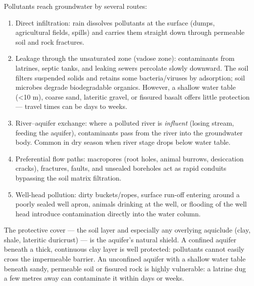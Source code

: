 \documentclass[11pt]{article}
\newcommand{\cle}[1]{{\popxbold\color{popdark}#1}}
\begin{document}
Pollutants reach groundwater by several routes:
\begin{enumerate}
\item \cle{Direct infiltration}: rain dissolves pollutants at the surface (dumps, agricultural fields, spills) and carries them straight down through permeable soil and rock fractures.
\item \cle{Leakage through the unsaturated zone (vadose zone)}: contaminants from latrines, septic tanks, and leaking sewers percolate slowly downward. The soil filters suspended solids and retains some bacteria/viruses by adsorption; soil microbes degrade biodegradable organics. However, a shallow water table (\textless 10 m), coarse sand, lateritic gravel, or fissured basalt offers little protection — travel times can be days to weeks.
\item \cle{River--aquifer exchange}: where a polluted river is \emph{influent} (losing stream, feeding the aquifer), contaminants pass from the river into the groundwater body. Common in dry season when river stage drops below water table.
\item \cle{Preferential flow paths}: macropores (root holes, animal burrows, desiccation cracks), fractures, faults, and unsealed boreholes act as rapid conduits bypassing the soil matrix filtration.
\item \cle{Well-head pollution}: dirty buckets/ropes, surface run-off entering around a poorly sealed well apron, animals drinking at the well, or flooding of the well head introduce contamination directly into the water column.
\end{enumerate}

The \cle{protective cover} — the soil layer and especially any overlying \cle{aquiclude} (clay, shale, lateritic duricrust) — is the aquifer's natural shield. A \cle{confined aquifer} beneath a thick, continuous clay layer is well protected: pollutants cannot easily cross the impermeable barrier. An \cle{unconfined aquifer} with a shallow water table beneath sandy, permeable soil or fissured rock is highly \cle{vulnerable}: a latrine dug a few metres away can contaminate it within days or weeks.
\end{document}
